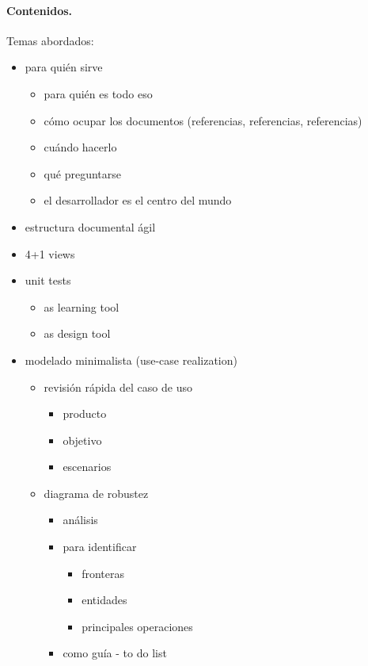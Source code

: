 \documentclass[11pt]{article}
\begin{document}
\paragraph{Contenidos.}
Temas abordados:
\begin{itemize}
\item para qui\'en sirve
      \begin{itemize}
\item     para qui\'en es todo eso
\item     c\'omo ocupar los documentos (referencias, referencias, referencias)
\item     cu\'ando hacerlo
\item     qu\'e preguntarse
\item     el desarrollador es el centro del mundo
      \end{itemize}
\item estructura documental \'agil
\item 4+1 views
\item unit tests
      \begin{itemize}
\item     as learning tool
\item     as design tool
      \end{itemize}
\item modelado minimalista (use-case realization)
      \begin{itemize}
\item     revisi\'on r\'apida del caso de uso
          \begin{itemize}
\item         producto
\item         objetivo
\item         escenarios
          \end{itemize}
\item     diagrama de robustez
          \begin{itemize}
\item         an\'alisis
\item         para identificar
              \begin{itemize}
\item             fronteras
\item             entidades
\item             principales operaciones
              \end{itemize}
\item         como gu\'ia - to do list
          \end{itemize}

\end{itemize}
\end{itemize}
\end{document}
